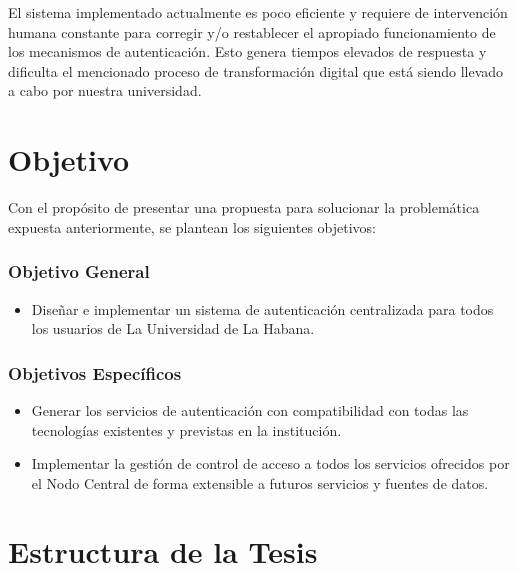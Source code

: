 El sistema implementado actualmente es poco eficiente y requiere de intervención humana constante para corregir y/o restablecer el apropiado funcionamiento de los mecanismos de autenticación. Esto genera tiempos elevados de respuesta y dificulta el mencionado proceso de transformación digital que está siendo llevado a cabo por nuestra universidad.


\section*{Objetivo}
Con el propósito de presentar una propuesta para solucionar la problemática expuesta anteriormente, se plantean los siguientes objetivos:

\subsubsection*{Objetivo General}

\begin{itemize}	
	\item Diseñar e implementar un sistema de autenticación centralizada para todos los usuarios de La Universidad de La Habana. 
\end{itemize}

\subsubsection*{Objetivos Específicos}
\begin{itemize}	
	\item Generar los servicios de autenticación con compatibilidad con todas las tecnologías existentes y previstas en la institución.
	\item Implementar la gestión de control de acceso a todos los servicios ofrecidos por el Nodo Central de forma extensible a futuros servicios y fuentes de datos.
\end{itemize}

\section*{Estructura de la Tesis}


